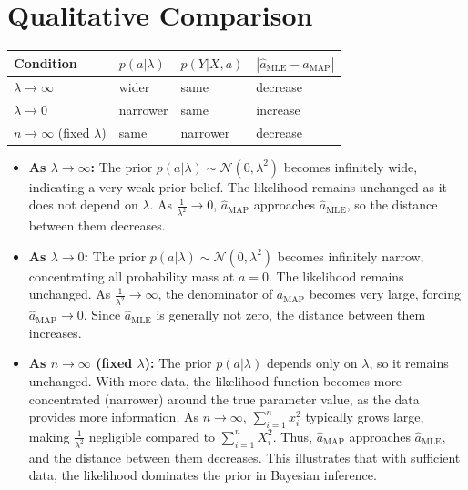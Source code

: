 \documentclass[11pt, a4paper, oneside]{memoir}
\begin{document}
\section{Qualitative Comparison}
\begin{table}[htbp]
    \centering
    \begin{tabular}{|p{}|p{}|p{}|p{}|}
        \hline
        \textbf{Condition}                       & \textbf{$p(a | \lambda)$} & \textbf{$p(Y | X, a)$} & \textbf{$|\hat{a}_{\text{MLE}} - \hat{a}_{\text{MAP}}|$} \\
        \hline
        $\lambda \rightarrow \infty$             & wider                     & same                   & decrease                                                 \\
        $\lambda \rightarrow 0$                  & narrower                  & same                   & increase                                                 \\
        $n \rightarrow \infty$ (fixed $\lambda$) & same                      & narrower               & decrease                                                 \\
        \hline
    \end{tabular}
\end{table}
\begin{itemize}
    \item \textbf{As $\lambda \rightarrow \infty$:}
          The prior $p(a | \lambda) \sim \mathcal{N}(0, \lambda^2)$ becomes infinitely wide, indicating a very weak prior belief.
          The likelihood remains unchanged as it does not depend on $\lambda$.
          As $\frac{1}{\lambda^2} \rightarrow 0$, $\hat{a}_{\text{MAP}}$ approaches $\hat{a}_{\text{MLE}}$, so the distance between them decreases.
    \item \textbf{As $\lambda \rightarrow 0$:}
          The prior $p(a | \lambda) \sim \mathcal{N}(0, \lambda^2)$ becomes infinitely narrow, concentrating all probability mass at $a=0$.
          The likelihood remains unchanged. As $\frac{1}{\lambda^2} \rightarrow \infty$,
          the denominator of $\hat{a}_{\text{MAP}}$ becomes very large, forcing $\hat{a}_{\text{MAP}} \rightarrow 0$.
          Since $\hat{a}_{\text{MLE}}$ is generally not zero, the distance between them increases.
    \item \textbf{As $n \rightarrow \infty$ (fixed $\lambda$):}
          The prior $p(a | \lambda)$ depends only on $\lambda$, so it remains unchanged.
          With more data, the likelihood function becomes more concentrated (narrower) around the true parameter value, as the data provides more information.
          As $n \rightarrow \infty$, $\sum_{i=1}^n x_i^2$ typically grows large, making $\frac{1}{\lambda^2}$ negligible compared to $\sum_{i=1}^n X_i^2$.
          Thus, $\hat{a}_{\text{MAP}}$ approaches $\hat{a}_{\text{MLE}}$, and the distance between them decreases. This illustrates that with sufficient data,
          the likelihood dominates the prior in Bayesian inference.
\end{itemize}
\end{document}
